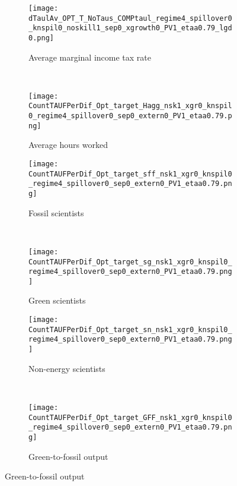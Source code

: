 	\begin{figure}[h!!!]
		\centering
		\caption{Optimal combined policy versus only optimal carbon tax: homogeneous skills}\label{fig:opt_Count_homskill}
		\begin{subfigure}{0.4\textwidth}
			\caption{Average marginal income tax rate }
			\texttt{[image: dTaulAv\_OPT\_T\_NoTaus\_COMPtaul\_regime4\_spillover0\_knspil0\_noskill1\_sep0\_xgrowth0\_PV1\_etaa0.79\_lgd0.png]}
		\end{subfigure}
		\begin{minipage}[]{0.1\textwidth}
			\
		\end{minipage}
		\begin{subfigure}{0.4\textwidth}
			\caption{Average hours worked}
			\texttt{[image: CountTAUFPerDif\_Opt\_target\_Hagg\_nsk1\_xgr0\_knspil0\_regime4\_spillover0\_sep0\_extern0\_PV1\_etaa0.79.png]}
		\end{subfigure}
		
		\begin{subfigure}{0.4\textwidth}
			\caption{Fossil scientists}
			\texttt{[image: CountTAUFPerDif\_Opt\_target\_sff\_nsk1\_xgr0\_knspil0\_regime4\_spillover0\_sep0\_extern0\_PV1\_etaa0.79.png]}
		\end{subfigure}
		\begin{minipage}[]{0.1\textwidth}
			\
		\end{minipage}
		\begin{subfigure}{0.4\textwidth}
			\caption{Green scientists}
			\texttt{[image: CountTAUFPerDif\_Opt\_target\_sg\_nsk1\_xgr0\_knspil0\_regime4\_spillover0\_sep0\_extern0\_PV1\_etaa0.79.png]}
		\end{subfigure}
		
		\begin{subfigure}{0.4\textwidth}
			\caption{Non-energy scientists}
			\texttt{[image: CountTAUFPerDif\_Opt\_target\_sn\_nsk1\_xgr0\_knspil0\_regime4\_spillover0\_sep0\_extern0\_PV1\_etaa0.79.png]}
		\end{subfigure}
		\begin{minipage}[]{0.1\textwidth}
			\
		\end{minipage}
		\begin{subfigure}{0.4\textwidth}
			\caption{Green-to-fossil output}
			\texttt{[image: CountTAUFPerDif\_Opt\_target\_GFF\_nsk1\_xgr0\_knspil0\_regime4\_spillover0\_sep0\_extern0\_PV1\_etaa0.79.png]}
		\end{subfigure}
	\end{figure}
	


